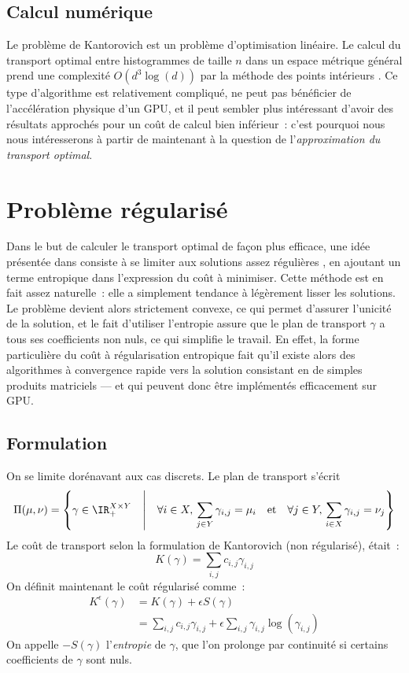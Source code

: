 \subsection{Calcul numérique}
Le problème de Kantorovich est un problème d'optimisation linéaire.
Le calcul du transport optimal entre histogrammes de taille $n$ dans un espace métrique général prend une complexité $O(d^3 \log(d))$ par la méthode des points intérieurs \cite{pele09}.
Ce type d'algorithme est relativement compliqué, ne peut pas bénéficier de l'accélération physique d'un GPU, et il peut sembler plus intéressant d'avoir des résultats approchés pour un coût de calcul bien inférieur~: c'est pourquoi nous nous intéresserons à partir de maintenant à la question de l'\emph{approximation du transport optimal}.

\section{Problème régularisé}
Dans le but de calculer le transport optimal de façon plus efficace, une idée présentée dans \cite{cuturi13} consiste à se limiter aux solutions \og assez régulières \fg, en ajoutant un terme entropique dans l'expression du coût à minimiser. Cette méthode est en fait assez naturelle~: elle a simplement tendance à légèrement lisser les solutions. Le problème devient alors strictement convexe, ce qui permet d'assurer l'unicité de la solution, et le fait d'utiliser l'entropie assure que le plan de transport $\gamma$ a tous ses coefficients non nuls, ce qui simplifie le travail. En effet, la forme particulière du coût à régularisation entropique fait qu'il existe alors des algorithmes à convergence rapide vers la solution consistant en de simples produits matriciels --- et qui peuvent donc être implémentés efficacement sur GPU.

\subsection{Formulation}
On se limite dorénavant aux cas discrets. Le plan de transport s'écrit 
\begin{equation}\label{eq:pi_discret}
\Pi(\mu,\nu) = \left\{ \gamma \in \IR_+^{X \times Y} \quad\middle|\quad
\forall i \in X,\,\sum_{j \in Y} \gamma_{i,j} = \mu_i \quad
 \text{et} \quad
\forall j \in Y ,\,\sum_{i \in X} \gamma_{i,j} = \nu_j \right\}
\end{equation}
Le coût de transport selon la formulation de Kantorovich (non régularisé), était~:
\[K(\gamma) = \sum_{i,j} c_{i,j} \gamma_{i,j} \]
On définit maintenant le coût régularisé comme~:
\begin{equation}\label{eq:keps}
\begin{split}
K^\epsilon (\gamma) 
 &= K(\gamma) + \epsilon S(\gamma) \\
&= \sum_{i,j} c_{i,j} \gamma_{i,j} + \epsilon \sum_{i,j} \gamma_{i,j} \log(\gamma_{i,j}) 
\end{split}\end{equation}
On appelle $-S(\gamma)$ l'\emph{entropie} de $\gamma$, que l'on prolonge par continuité si certains coefficients de $\gamma$ sont nuls.

